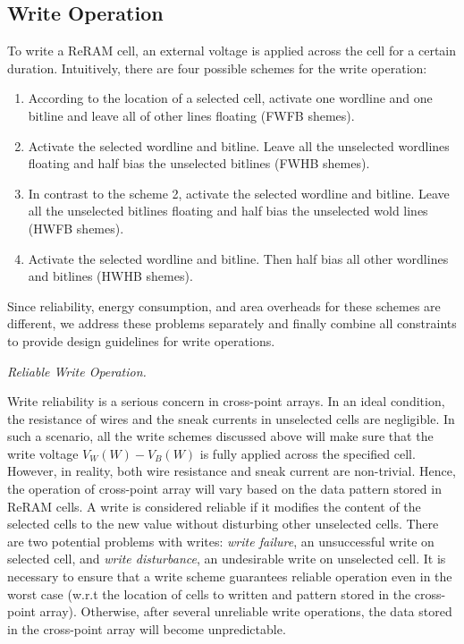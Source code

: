 \subsection{Write Operation}
To write a ReRAM cell, an external voltage is applied across the cell for a certain duration. Intuitively, there are four possible schemes for the write operation:
\begin{enumerate}
  \item According to the location of a selected cell, activate one wordline and one bitline and leave all of other lines floating (FWFB shemes).
  \item Activate the selected wordline and bitline. Leave all the unselected wordlines floating and half bias the unselected bitlines (FWHB shemes).
  \item In contrast to the scheme 2, activate the selected wordline and bitline. Leave all the unselected bitlines floating and half bias the unselected wold lines (HWFB shemes).
  \item Activate the selected wordline and bitline. Then half bias all other wordlines and bitlines (HWHB shemes).
\end{enumerate}
Since reliability, energy consumption, and area overheads for these
schemes are different, we address these problems
separately and finally combine all constraints to provide design
guidelines for write operations.

\vspace{6pt} \emph{Reliable Write Operation.} \vspace{6pt}

Write reliability is a serious concern in cross-point arrays. In an ideal condition, the resistance of wires and the sneak currents in unselected cells are negligible. In such a scenario, all the write schemes discussed above will make sure that the write voltage $V_W(W)-V_B(W)$ is fully applied across the specified cell. However, in reality, both wire resistance and sneak current are non-trivial. Hence, the operation of cross-point array will vary based on the data pattern stored in ReRAM cells.
A write is considered reliable if it modifies the content of the selected cells to the new value without disturbing other unselected cells.
There are two potential problems with writes: \emph{write failure}, an unsuccessful write on selected cell, and \emph{write disturbance}, an undesirable write on unselected cell. It is necessary to ensure that a write scheme guarantees reliable operation even in the worst case (w.r.t the location of cells to written and pattern stored in the cross-point array). Otherwise, after several unreliable write operations, the data stored in the cross-point array will become unpredictable.

